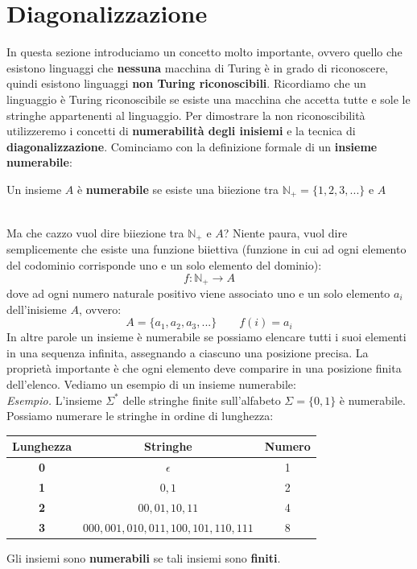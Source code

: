 \section{Diagonalizzazione}
In questa sezione introduciamo un concetto molto importante, ovvero quello che esistono linguaggi che \textbf{nessuna} macchina di Turing è in grado di riconoscere, quindi esistono
linguaggi \textbf{non Turing riconoscibili}. Ricordiamo che un linguaggio è Turing riconoscibile se esiste una macchina che accetta tutte e sole le stringhe appartenenti al linguaggio. 
Per dimostrare la non riconoscibilità utilizzeremo i concetti di \textbf{numerabilità degli inisiemi} e la tecnica di \textbf{diagonalizzazione}. Cominciamo con la definizione formale di un \textbf{insieme numerabile}:
\colorbox{SALZO}{\parbox{\dimexpr\linewidth-2\fboxsep}{\begin{definition}
   Un insieme $A$ è \textbf{numerabile} se esiste una biiezione tra $\mathbb{N}_+ = \{ 1,2,3,...  \}$ e $A$
\end{definition}}}\smallskip\\ 
Ma che cazzo vuol dire biiezione tra $\mathbb{N}_+$ e $A$? Niente paura, vuol dire semplicemente che esiste una funzione biiettiva (funzione in cui ad ogni elemento del codominio corrisponde uno e un solo elemento del dominio):
\[ f:\mathbb{N}_+ \to A    \]
dove ad ogni numero naturale positivo viene associato uno e un solo elemento $a_i$ dell'inisieme $A$, ovvero:
\[      A = \{ a_1,a_2,a_3,...  \} \qquad f(i) = a_i   \]  
In altre parole un insieme è numerabile se possiamo elencare tutti i suoi elementi in una sequenza infinita, assegnando a ciascuno una posizione precisa. La proprietà importante è che ogni elemento deve comparire in una posizione finita dell'elenco. 
Vediamo un esempio di un insieme numerabile:\smallskip\\
\textit{Esempio.} L'insieme $\Sigma^*$ delle stringhe finite sull'alfabeto $\Sigma = \{  0,1 \}$ è numerabile.\\
Possiamo numerare le stringhe in ordine di lunghezza:\\
\begin{center}
\begin{tabular}{|c|c|c|}
\hline
\textbf{Lunghezza} & \textbf{Stringhe} & \textbf{Numero}\\
\hline
\textbf{0} & $\epsilon$ & 1\\
\textbf{1} & $0,1$ & 2 \\
\textbf{2} & $00,01,10,11$ & 4\\
\textbf{3} & $000,001,010,011,100,101,110,111$ & 8\\
\hline 



\end{tabular}
\end{center}
\noindent Gli insiemi sono \textbf{numerabili} se tali insiemi sono \textbf{finiti}. 


